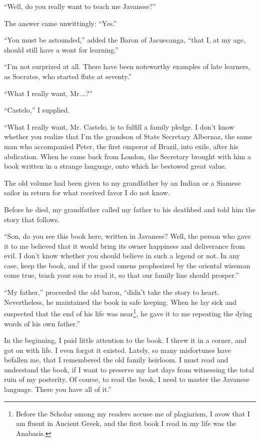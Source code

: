 \documentclass[a4paper,12pt]{book}
\begin{document}
``Well, do you really want to teach me Javanese?''

The answer came unwittingly: ``Yes.''

``You must be astounded,'' added the Baron
of Jacuecanga, ``that I, at my age, should
still have a wont for learning.''

``I'm not surprized at all. There have been
noteworthy examples of late learners,
as Socrates, who started flute at seventy.''

``What I really want, Mr.\ldots?''

``Castelo,'' I supplied.

``What I really want, Mr. Castelo,
is to fulfill a family pledge.
I don't know whether you realize that I'm the
grandson of State Secretary Albernaz, the same
man who accompanied Peter,
the first emperor of Brazil,
into exile, after his abdication.
When he came back from London,
the Secretary brought with him a book written in a strange
language, onto which he bestowed great value.

The old volume had been given to my grandfather
by an Indian or a Siamese sailor in
return for what received favor I do not know.

Before he died, my grandfather called
my father to his deathbed and told him
the story that follows.

``Son, do you see this book here, written in Javanese?
Well, the person who
gave it to me believed that it would bring its owner
happiness and deliverance from evil. I don't know
whether you should believe in such a legend or not.
In any case, keep the book, and if
the good omens prophesized by the oriental wiseman
come true, teach your son to read it,
so that our family line should prosper.''

``My father,'' proceeded the old baron, ``didn't take
the story to heart. Nevertheless, he maintained
the book in safe keeping.
When he lay sick and suspected that the end of his
life was near\footnote{Before the Scholar among
  my readers accuse me of plagiarism,
  I avow that I am fluent in Ancient Greek,
  and the first book I read in my life
  was the Anabasis.},
he gave it to me repeating the
dying words of his own father.''

In the beginning, I 
paid little attention to the book. I threw it 
in a corner, and got on with life.
I even forgot it existed. Lately,
so many misfortunes have befallen me,
that I remembered the old family heirloom.
I must read and understand the book, if I want to
preserve my last days from witnessing the total
ruin of my posterity. Of course, to read the book,
I need to master the Javanese language.
There you have all of it.''
\end{document}

